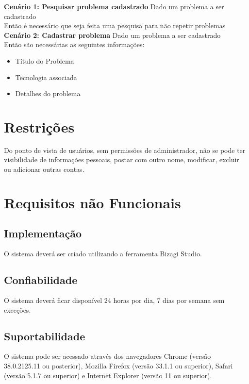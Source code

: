 \textbf{Cenário 1: Pesquisar problema cadastrado}
Dado um problema a ser cadastrado\\
Então é necessário que seja feita uma pesquisa para não repetir problemas\\

\textbf{Cenário 2: Cadastrar problema}
Dado um problema a ser cadastrado\\
Então são necessárias as seguintes informações:
\begin{itemize}
\item Título do Problema
\item Tecnologia associada
\item Detalhes do problema
\end{itemize} 

\section{Restrições}
Do ponto de vista de usuários, sem permissões de administrador, não se pode ter visibilidade de informações pessoais, postar com outro nome, modificar, excluir ou adicionar outras contas.

\section{Requisitos não Funcionais}

\subsection{Implementação}
O sistema deverá ser criado utilizando a ferramenta Bizagi Studio.

\subsection{Confiabilidade}
O sistema deverá ficar disponível 24 horas por dia, 7 dias por semana sem exceções.

\subsection{Suportabilidade}
O sistema pode ser acessado através dos navegadores Chrome (versão 38.0.2125.11 ou posterior),  Mozilla  Firefox (versão 33.1.1 ou superior),  Safari (versão 5.1.7 ou superior) e Internet Explorer (versão 11 ou superior).

